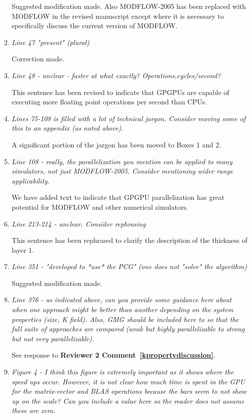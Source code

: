 \documentclass[12pt]{article} %
\begin{document}
\begin{enumerate}
Suggested modification made. Also MODFLOW-2005 has been replaced with MODFLOW in the revised manuscript except where it is necessary to specifically discuss the current version of MODFLOW.

\item \textit{Line 47 "present" (plural)} 

Correction made. 

\item \textit{Line 48 - unclear - faster at what exactly? Operations,cycles/second? } 

This sentence has been revised to indicate that GPGPUs are capable of executing more floating point operations per second than CPUs.

\item \textit{Lines 75-108 is filled with a lot of technical jargon. Consider moving some of this to an appendix (as noted above). } 

A significant portion of the jargon has been moved to Boxes 1 and 2.

\item \textit{Line 108 - really, the parallelization you mention can be applied to many simulators, not just MODFLOW-2005. Consider mentioning wider range applicability. } 

We have added text to indicate that GPGPU parallelization has great potential for MODFLOW and other numerical simulators.

\item \textit{Line 213-214 - unclear. Consider rephrasing } 

This sentence has been rephrased to clarify the description of the thickness of layer 1.

\item \textit{Line 351 - "developed to *use* the PCG" (one does not "solve" the algorithm) } 

Suggested modification made.

\item \textit{Line 376 - as indicated above, can you provide some guidance here about when one approach might be better than another depending on the system properties (size, K field). Also, GMG should be included here to so that the full suite of approaches are compared (weak but highly parallelizable to strong but not very parallelizable). } 

See response to \textbf{Reviewer 2 Comment~\ref{kpropertydiscussion}}.

\item \textit{Figure 4 - I think this figure is extremely important as it shows where the speed ups occur. However, it is not clear how much time is spent in the GPU for the matrix-vector and BLAS operations because the bars seem to not show up on the scale? Can you include a value here so the reader does not assume these are zero. } 


\end{enumerate}
\end{document}
